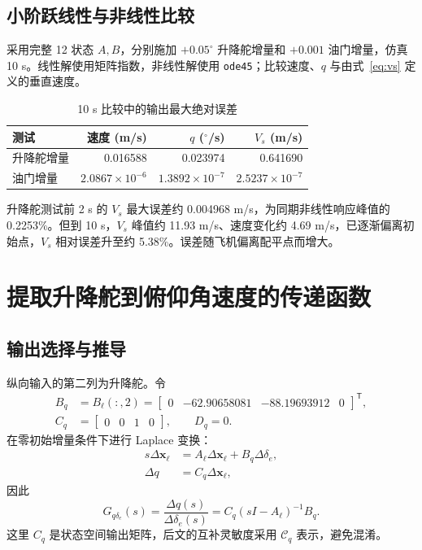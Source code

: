 \documentclass[UTF8,a4paper,11pt,fontset=windows]{ctexart}
\newcommand{\de}{\delta_e}
\newcommand{\Gq}{G_{q\delta_e}}
\begin{document}
\subsection{小阶跃线性与非线性比较}
采用完整 12 状态 $A,B$，分别施加 $+0.05^\circ$ 升降舵增量和 $+0.001$ 油门增量，仿真 10 s。线性解使用矩阵指数，非线性解使用 \texttt{ode45}；比较速度、$q$ 与由式~\eqref{eq:vs} 定义的垂直速度。
\begin{table}[H]\centering
\caption{10 s 比较中的输出最大绝对误差}
\begin{tabular}{lrrr}\toprule
测试&速度 (m/s)&$q$ ($^\circ$/s)&$V_s$ (m/s)\\\midrule
升降舵增量&0.016588&0.023974&0.641690\\
油门增量&$2.0867\times10^{-6}$&$1.3892\times10^{-7}$&$2.5237\times10^{-7}$\\\bottomrule
\end{tabular}
\end{table}
升降舵测试前 2 s 的 $V_s$ 最大误差约 0.004968 m/s，为同期非线性响应峰值的 0.2253\%。但到 10 s，$V_s$ 峰值约 11.93 m/s、速度变化约 4.69 m/s，已逐渐偏离初始点，$V_s$ 相对误差升至约 5.38\%。误差随飞机偏离配平点而增大。

\section{提取升降舵到俯仰角速度的传递函数}
\subsection{输出选择与推导}
纵向输入的第二列为升降舵。令
\begin{equation}
\begin{aligned}
B_q&=B_\ell(:,2)=\begin{bmatrix}0&-62.90658081&-88.19693912&0\end{bmatrix}^{\mathsf T},\\
C_q&=\begin{bmatrix}0&0&1&0\end{bmatrix},\qquad D_q=0.
\end{aligned}
\end{equation}
在零初始增量条件下进行 Laplace 变换：
\begin{align}
s\Delta\bm x_\ell&=A_\ell\Delta\bm x_\ell+B_q\Delta\de,\\
\Delta q&=C_q\Delta\bm x_\ell,
\end{align}
因此
\begin{equation}\label{eq:gdefinition}
\boxed{\Gq(s)=\frac{\Delta q(s)}{\Delta\de(s)}=C_q(sI-A_\ell)^{-1}B_q.}
\end{equation}
这里 $C_q$ 是状态空间输出矩阵，后文的互补灵敏度采用 $\mathcal C_q$ 表示，避免混淆。
\end{document}
